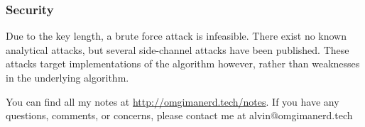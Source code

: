\documentclass{math}
\begin{document}
\subsubsection*{Security}
Due to the key length, a brute force attack is infeasible. There exist no known
analytical attacks, but several side-channel attacks have been published. These
attacks target implementations of the algorithm however, rather than weaknesses
in the underlying algorithm.

\begin{center}
  You can find all my notes at \url{http://omgimanerd.tech/notes}. If you have
  any questions, comments, or concerns, please contact me at
  alvin@omgimanerd.tech
\end{center}
\end{document}
